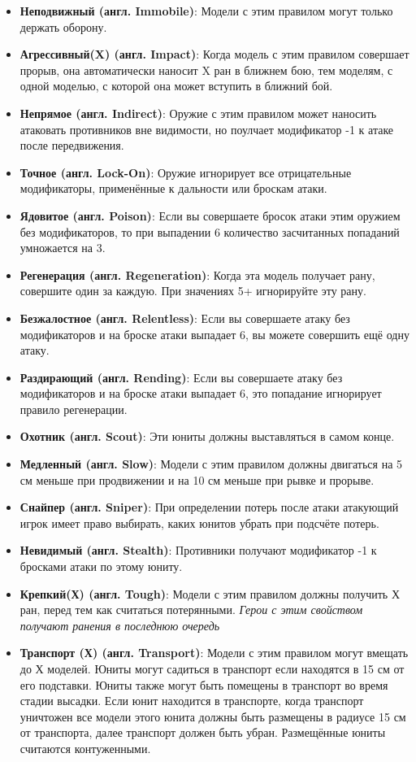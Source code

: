 \documentclass[twocolumn]{article}
\newcommand{\h}[1]{\textbf{#1}}
\begin{document}
\begin{itemize}
    \item \h{Неподвижный (англ. Immobile)}: Модели с этим правилом могут только держать оборону.
    \item \h{Агрессивный(X) (англ. Impact)}: Когда модель с этим правилом совершает прорыв, она автоматически наносит X ран в ближнем бою, тем моделям, с одной моделью, с которой она может вступить в ближний бой.
    \item \h{Непрямое (англ. Indirect)}: Оружие с этим правилом может наносить атаковать противников вне видимости, но поулчает модификатор -1 к атаке после передвижения.
    \item \h{Точное (англ. Lock-On)}: Оружие игнорирует все отрицательные модификаторы, применённые к дальности или броскам атаки.
    \item \h{Ядовитое (англ. Poison)}: Если вы совершаете бросок атаки этим оружием без модификаторов, то при выпадении 6 количество засчитанных попаданий умножается на 3.
    \item \h{Регенерация (англ. Regeneration)}: Когда эта модель получает рану, совершите один за каждую. При значениях 5+ игнорируйте эту рану.
    \item \h{Безжалостное (англ. Relentless)}: Если вы совершаете атаку без модификаторов и на броске атаки выпадает 6, вы можете совершить ещё одну атаку.
    \item \h{Раздирающий (англ. Rending)}: Если вы совершаете атаку без модификаторов и на броске атаки выпадает 6, это попадание игнорирует правило регенерации.
    \item \h{Охотник (англ. Scout)}: Эти юниты должны выставляться в самом конце.
    \item \h{Медленный (англ. Slow)}: Модели с этим правилом должны двигаться на 5 см меньше при продвижении и на 10 см меньше при рывке и прорыве.
    \item \h{Снайпер (англ. Sniper)}: При определении потерь после атаки атакующий игрок имеет право выбирать, каких юнитов убрать при подсчёте потерь.
    \item \h{Невидимый (англ. Stealth)}: Противники получают модификатор -1 к бросками атаки по этому юниту.
    \item \h{Крепкий(Х) (англ. Tough)}: Модели с этим правилом должны получить Х ран, перед тем как считаться потерянными. \emph{Герои с этим свойством получают ранения в последнюю очередь}
    \item \h{Транспорт (Х) (англ. Transport)}: Модели с этим правилом могут вмещать до Х моделей. Юниты могут садиться в транспорт если находятся в 15 см от его подставки. Юниты также могут быть помещены в транспорт во время стадии высадки. Если юнит находится в транспорте, когда транспорт уничтожен все модели этого юнита должны быть размещены в радиусе 15 см от транспорта, далее транспорт должен быть убран. Размещённые юниты считаются контуженными.
\end{itemize}
\end{document}
